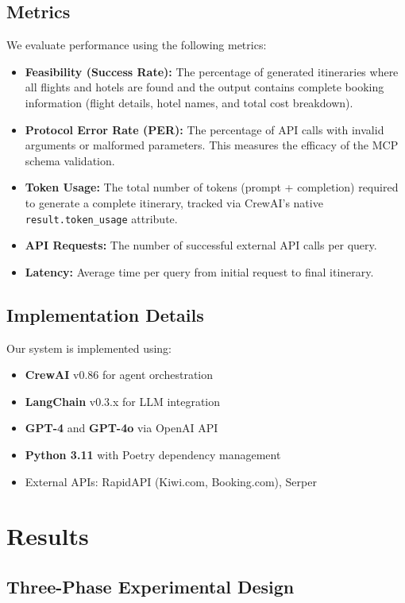 \documentclass[10pt,twocolumn]{article}
\begin{document}
\subsection{Metrics}
We evaluate performance using the following metrics:
\begin{itemize}
    \item \textbf{Feasibility (Success Rate):} The percentage of generated itineraries where all flights and hotels are found and the output contains complete booking information (flight details, hotel names, and total cost breakdown).
    \item \textbf{Protocol Error Rate (PER):} The percentage of API calls with invalid arguments or malformed parameters. This measures the efficacy of the MCP schema validation.
    \item \textbf{Token Usage:} The total number of tokens (prompt + completion) required to generate a complete itinerary, tracked via CrewAI's native \texttt{result.token\_usage} attribute.
    \item \textbf{API Requests:} The number of successful external API calls per query.
    \item \textbf{Latency:} Average time per query from initial request to final itinerary.
\end{itemize}

\subsection{Implementation Details}
Our system is implemented using:
\begin{itemize}
    \item \textbf{CrewAI} v0.86 for agent orchestration
    \item \textbf{LangChain} v0.3.x for LLM integration
    \item \textbf{GPT-4} and \textbf{GPT-4o} via OpenAI API
    \item \textbf{Python 3.11} with Poetry dependency management
    \item External APIs: RapidAPI (Kiwi.com, Booking.com), Serper
\end{itemize}

\section{Results}

\subsection{Three-Phase Experimental Design}
\end{document}
